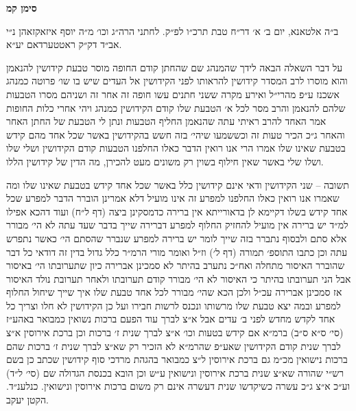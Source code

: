 \documentclass[12pt, openany]{book}
\newcommand{\chapname}{}
\newcommand{\newchap}[1]{
	\addcontentsline{toc}{chapter}{#1}
	\renewcommand{\chapname}{#1}
		\begin{center}
			\textbf{%
\fontsize{16pt}{16pt}\selectfont
				#1}
		\end{center}
}
\begin{document}
\newchap{סימן קמ}
\begin{multicols}{2}
ב״ה אלטאנא, יום ב׳ א׳ דר״ח טבת תרכ״ו לפ״ק. לחתני הרה״ג וכו׳ מ״ה יוסף איזאקזאהן נ״י אב״ד דק״ק ראטטערדאם יע״א.\\\vspace{0pt}

על דבר השאלה הבאה לידך שהמנהג שם שהחתן קודם החופה מוסר טבעת קידושין להנאמן והוא מוסרו לרב המסדר קידושין להראותו לפני הקידושין אל העדים שיש בו שו׳ פרוטה כמנהג אשכנז ע״פ מהרי״ל ואירע מקרה ששני חתנים עשו חופה זה אחר זה ושניהם מסרו הטבעות שלהם להנאמן והרב מסר לכל א׳ הטבעת שלו קודם הקידושין כמנהג ויהי אחרי כלות החופות אמר האחד להרב ראיתי עתה שהנאמן החליף הטבעות ונתן לי הטבעת של החתן האחר והאחר ג״כ הכיר טעות זה וכששמעו שיהי׳ בזה חשש בהקידושין באשר שכל אחד מהם קידש בטבעת שאינו שלו אמרו הרי אנו רואין הדבר כאלו החלפנו הטבעות קודם הקידושין ושלי שלו ושלו שלי באשר שאין חילוף בשוין רק משונים מעט להכירן, מה הדין של קידושין הללו.\\\vspace{0pt}

תשובה – שני הקידושין ודאי אינם קידושין כלל באשר שכל אחד קידש בטבעת שאינו שלו ומה שאמרו אנו רואין כאלו החלפנו למפרע זה אינו מועיל דלא אמרינן הוברר הדבר למפרע שכל אחד קידש בשלו דקיימא לן בדאורייתא אין ברירה כדמסקינן ביצה (דף ל״ח) ועוד דהכא אפילו למ״ד יש ברירה אין מועיל להחזיק החלוף למפרע דברירה שייך בדבר שעד עתה לא הי׳ מבורר אלא סתם ולבסוף נתברר בזה שייך לומר יש ברירה למפרע שנברר שהסתם הי׳ כאשר נתפרש עתה וכן כתבו התוספ׳ תמורה (דף ל׳) וז״ל ואומר מורי הרמ״ר כלל גדול בדין זה דודאי כל דבר שהוברר האיסור מתחלה ואח״כ נתערב בהיתר לא סמכינן אברירה כיון שתערובתו הי׳ באיסור אבל הני תערובתו בהיתר כי האיסור לא הי׳ מבורר קודם תערובתו ולאחר תערובת נולד האיסור אז סמכינן אברירה עכ״ל ולכן הכא שהי׳ מבורר לכל אחד טבעת שלו איך שייך שיחול החלוף למפרע ובמה יצא טבעת שלו מרשותו ונכנס לרשות חבירו ועל כן הקידושין לא חלו וצריך כל אחד לקדש מחדש לפני ב׳ עדים אבל א״צ לברך עוד הפעם ברכות נשואין כמבואר באהע״ז (סי׳ ס״א ס״ב) ברמ״א אם קידש בטעות וכו׳ א״צ לברך שנית ז׳ ברכות וכן ברכת אירוסין א״צ לברך שנית קודם הקידושין שאע״פ שהרמ״א לא הזכיר רק שא״צ לברך שנית ז׳ ברכות שהם ברכות נישואין מכ״מ גם ברכת אירוסין ל״צ כמבואר בהגהת מרדכי סוף קידושין שכתב כן בשם רש״י שהורה שא״צ שנית ברכת אירוסין ונישואין ע״ש וכן הובא בכנסת הגדולה שם (סי׳ ל״ד) וע״כ א״צ ג״כ עשרה כשיקדשו שנית דעשרה אינם רק משום ברכות אירוסין ונישואין. כנלענ״ד. הקטן יעקב.\\\vspace{0pt}

\end{multicols}\newpage
\end{document}
